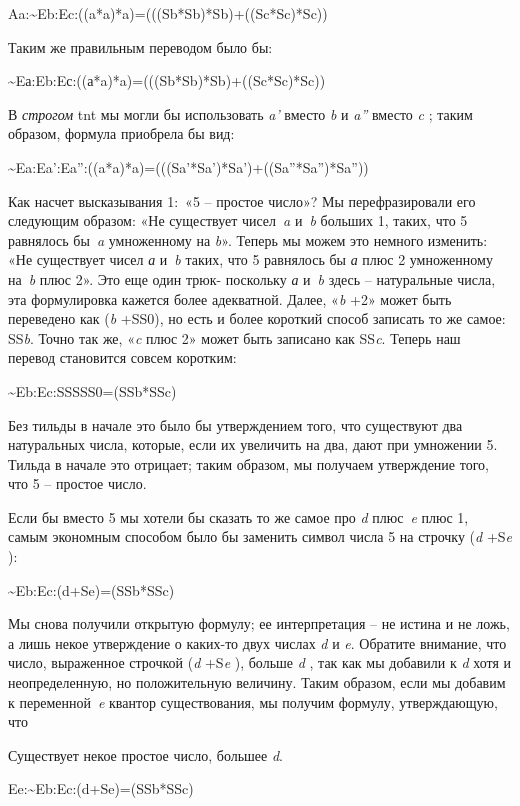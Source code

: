 \documentclass[../main.tex]{subfiles}
\begin{document}
Aa:\textasciitilde Eb:Ec:((a*a)*a)=(((Sb*Sb)*Sb)+((Sc*Sc)*Sc))

Таким же правильным переводом было бы:

\textasciitilde Eа:Eb:Eс:((а*a)*a)=(((Sb*Sb)*Sb)+((Sc*Sc)*Sc))

В \emph{строгом} \acs{tnt} мы могли бы использовать \emph{a'} вместо \emph{b} и \emph{a''} вместо \emph{c} ; таким образом, формула приобрела бы вид:

\textasciitilde Ea:Ea':Ea'':((a*a)*a)=(((Sa'*Sa')*Sa')+((Sa''*Sa'')*Sa''))

Как насчет высказывания 1:~«5 \--- простое число»? Мы перефразировали его следующим образом: «Не существует чисел~\emph{a} и~\emph{b} больших 1, таких, что 5 равнялось бы~\emph{a} умноженному на \emph{b}». Теперь мы можем это немного изменить: «Не существует чисел \emph{а} и~\emph{b} таких, что 5 равнялось бы \emph{а} плюс 2 умноженному на~\emph{b} плюс 2». Это еще один трюк- поскольку \emph{а} и~\emph{b} здесь \--- натуральные числа, эта формулировка кажется более адекватной. Далее, «\emph{b} +2» может быть переведено как (\emph{b} +SS0), но есть и более короткий способ записать то же самое: SS\emph{b}. Точно так же, «\emph{c} плюс 2» может быть записано как SS\emph{c}. Теперь наш перевод становится совсем коротким:

\textasciitilde Eb:Ec:SSSSS0=(SSb*SSc)

Без тильды в начале это было бы утверждением того, что существуют два натуральных числа, которые, если их увеличить на два, дают при умножении 5. Тильда в начале это отрицает; таким образом, мы получаем утверждение того, что 5 \--- простое число.

Если бы вместо 5 мы хотели бы сказать то же самое про \emph{d} плюс~\emph{e} плюс 1, самым экономным способом было бы заменить символ числа 5 на строчку (\emph{d} +S\emph{e} ):

\textasciitilde Eb:Ec:(d+Se)=(SSb*SSc)

Мы снова получили открытую формулу; ее интерпретация \--- не истина и не ложь, а лишь некое утверждение о каких-то двух числах \emph{d} и \emph{e}. Обратите внимание, что число, выраженное строчкой (\emph{d} +S\emph{e} ), больше \emph{d} , так как мы добавили к \emph{d} хотя и неопределенную, но положительную величину. Таким образом, если мы добавим к переменной~\emph{e} квантор существования, мы получим формулу, утверждающую, что

Существует некое простое число, большее \emph{d}.

Ee:\textasciitilde Eb:Ec:(d+Se)=(SSb*SSc)
\end{document}
